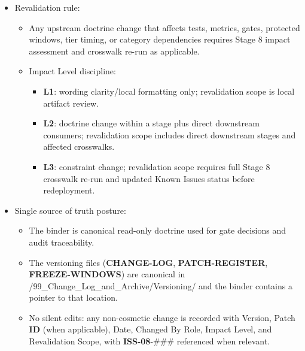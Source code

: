 \documentclass[10pt]{article}
\begin{document}
\begin{itemize}
\item Revalidation rule:
  \begin{itemize}
  \item Any upstream doctrine change that affects tests, metrics, gates, protected windows, tier timing, or category dependencies requires Stage 8 impact assessment and crosswalk re-run as applicable.
  \item Impact Level discipline:
    \begin{itemize}
    \item \textbf{L1}: wording clarity/local formatting only; revalidation scope is local artifact review.
    \item \textbf{L2}: doctrine change within a stage plus direct downstream consumers; revalidation scope includes direct downstream stages and affected crosswalks.
    \item \textbf{L3}: constraint change; revalidation scope requires full Stage 8 crosswalk re-run and updated Known Issues status before redeployment.
    \end{itemize}
  \end{itemize}

\item Single source of truth posture:
  \begin{itemize}
  \item The binder is canonical read-only doctrine used for gate decisions and audit traceability.
  \item The versioning files (\textbf{CHANGE-LOG}, \textbf{PATCH-REGISTER}, \textbf{FREEZE-WINDOWS}) are canonical in /99\_Change\_Log\_and\_Archive/Versioning/ and the binder contains a pointer to that location.
  \item No silent edits: any non-cosmetic change is recorded with Version, Patch \textbf{ID} (when applicable), Date, Changed By Role, Impact Level, and Revalidation Scope, with \textbf{ISS-08}-\#\#\# referenced when relevant.
  \end{itemize}
\end{itemize}
\end{document}
